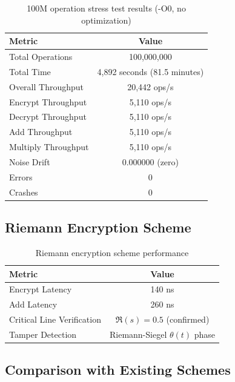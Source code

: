 \documentclass[11pt,a4paper]{article}
\theoremstyle{remark}
\begin{document}
\begin{table}[H]
\centering
\begin{tabular}{lc}
\toprule
\textbf{Metric} & \textbf{Value} \\
\midrule
Total Operations & 100,000,000 \\
Total Time & 4,892 seconds (81.5 minutes) \\
Overall Throughput & 20,442 ops/s \\
Encrypt Throughput & 5,110 ops/s \\
Decrypt Throughput & 5,110 ops/s \\
Add Throughput & 5,110 ops/s \\
Multiply Throughput & 5,110 ops/s \\
Noise Drift & 0.000000 (zero) \\
Errors & 0 \\
Crashes & 0 \\
\bottomrule
\end{tabular}
\caption{100M operation stress test results (-O0, no optimization)}
\end{table}

\subsection{Riemann Encryption Scheme}

\begin{table}[H]
\centering
\begin{tabular}{lc}
\toprule
\textbf{Metric} & \textbf{Value} \\
\midrule
Encrypt Latency & 140 ns \\
Add Latency & 260 ns \\
Critical Line Verification & $\Re(s) = 0.5$ (confirmed) \\
Tamper Detection & Riemann-Siegel $\theta(t)$ phase \\
\bottomrule
\end{tabular}
\caption{Riemann encryption scheme performance}
\end{table}

\subsection{Comparison with Existing Schemes}
\end{document}
